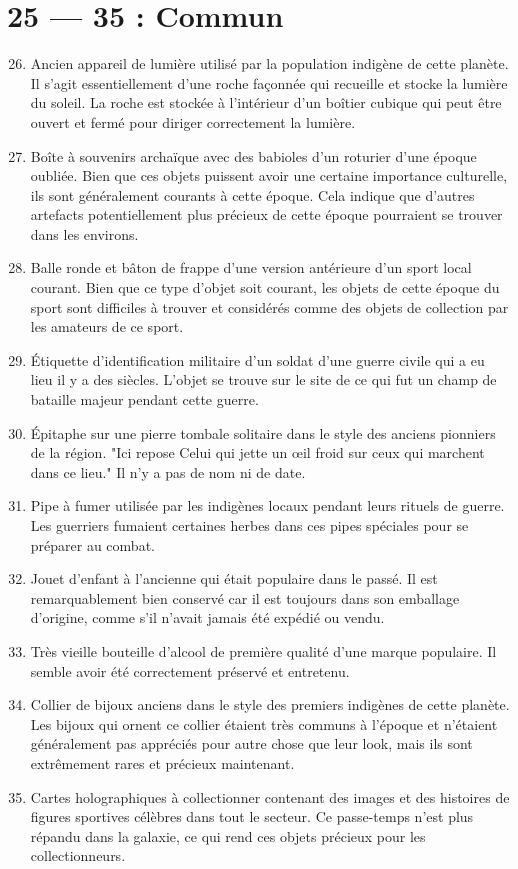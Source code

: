 \documentclass{article}
\begin{document}
\section*{25 --- 35 : Commun}
\begin{enumerate}
	\setcounter{enumi}{25}
	\item Ancien appareil de lumière utilisé par la population indigène de cette planète. Il s'agit essentiellement d'une roche façonnée qui recueille et stocke la lumière du soleil. La roche est stockée à l'intérieur d'un boîtier cubique qui peut être ouvert et fermé pour diriger correctement la lumière.
	\item Boîte à souvenirs archaïque avec des babioles d'un roturier d'une époque oubliée. Bien que ces objets puissent avoir une certaine importance culturelle, ils sont généralement courants à cette époque. Cela indique que d'autres artefacts potentiellement plus précieux de cette époque pourraient se trouver dans les environs.
	\item Balle ronde et bâton de frappe d'une version antérieure d'un sport local courant. Bien que ce type d'objet soit courant, les objets de cette époque du sport sont difficiles à trouver et considérés comme des objets de collection par les amateurs de ce sport.
	\item Étiquette d'identification militaire d'un soldat d'une guerre civile qui a eu lieu il y a des siècles. L'objet se trouve sur le site de ce qui fut un champ de bataille majeur pendant cette guerre.
	\item Épitaphe sur une pierre tombale solitaire dans le style des anciens pionniers de la région. "Ici repose Celui qui jette un œil froid sur ceux qui marchent dans ce lieu." Il n'y a pas de nom ni de date.
	\item Pipe à fumer utilisée par les indigènes locaux pendant leurs rituels de guerre. Les guerriers fumaient certaines herbes dans ces pipes spéciales pour se préparer au combat.
	\item Jouet d'enfant à l'ancienne qui était populaire dans le passé. Il est remarquablement bien conservé car il est toujours dans son emballage d'origine, comme s'il n'avait jamais été expédié ou vendu.
	\item Très vieille bouteille d'alcool de première qualité d'une marque populaire. Il semble avoir été correctement préservé et entretenu.
	\item Collier de bijoux anciens dans le style des premiers indigènes de cette planète. Les bijoux qui ornent ce collier étaient très communs à l'époque et n'étaient généralement pas appréciés pour autre chose que leur look, mais ils sont extrêmement rares et précieux maintenant.
	\item Cartes holographiques à collectionner contenant des images et des histoires de figures sportives célèbres dans tout le secteur. Ce passe-temps n'est plus répandu dans la galaxie, ce qui rend ces objets précieux pour les collectionneurs.
\end{enumerate}
\end{document}
